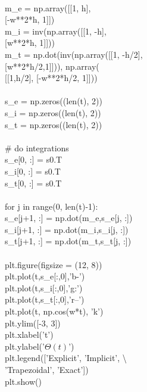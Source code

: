 \begin{mysolution}
\begin{boxB}
~\\
m\_e = np.array([[1, h], \\
\hspace*{2cm}[-w**2*h, 1]])\\
m\_i = inv(np.array([[1, -h], \\
\hspace*{2cm}[w**2*h, 1]]))\\
m\_t = np.dot(inv(np.array([[1, -h/2], \\
\hspace*{1cm}[w**2*h/2,1]])), np.array(\\
\hspace*{1.5cm}[[1,h/2], [-w**2*h/2, 1]]))\\
\\
s\_e = np.zeros((len(t), 2))\\
s\_i = np.zeros((len(t), 2))\\
s\_t = np.zeros((len(t), 2))\\
\\
\# do integrations\\
s\_e[0, :] = s0.T\\
s\_i[0, :] = s0.T\\
s\_t[0, :] = s0.T\\
\\
for j in range(0, len(t)-1):\\
\hspace*{1cm}s\_e[j+1, :] = np.dot(m\_e,s\_e[j, :])\\
\hspace*{1cm}s\_i[j+1, :] = np.dot(m\_i,s\_i[j, :])\\
\hspace*{1cm}s\_t[j+1, :] = np.dot(m\_t,s\_t[j, :])\\
\\    
plt.figure(figsize = (12, 8))\\
plt.plot(t,s\_e[:,0],'b-')\\
plt.plot(t,s\_i[:,0],'g:')\\
plt.plot(t,s\_t[:,0],'r--')\\
plt.plot(t, np.cos(w*t), 'k')\\
plt.ylim([-3, 3])\\
plt.xlabel('t')\\
plt.ylabel('$\Theta (t)$')\\
plt.legend(['Explicit', 'Implicit', \textbackslash \\
\hspace*{2cm}'Trapezoidal', 'Exact'])\\
plt.show()\\
\end{boxB}
\end{mysolution}


